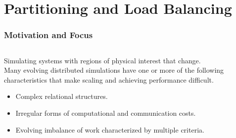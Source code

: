 \documentclass[aspectratio=169]{beamer}
\begin{document}
\section{Partitioning and Load Balancing}
\begin{frame}
  \frametitle{Motivation and Focus}
  \begin{columns}
    \begin{column}{0.7\textwidth}
      Simulating systems with regions of physical interest that change.\\
      \smallskip
      Many evolving distributed simulations have one or more of the following
      characteristics that make scaling and achieving performance difficult. \\
      \begin{itemize}
        \item Complex relational structures.
        \item Irregular forms of computational and communication costs.
        \item Evolving imbalance of work characterized by multiple criteria.
      \end{itemize}


\end{column}
\end{columns}
\end{frame}
\end{document}
